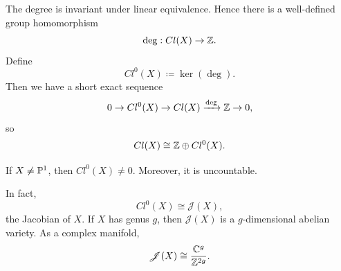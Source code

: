 The degree is invariant under linear equivalence.
Hence there is a well-defined group homomorphism
\[
    \deg : Cl(X) \to \mathbb{Z}.
\]
Define
\[
    Cl^0(X) \coloneqq \ker(\deg).
\]
Then we have a short exact sequence
\[
    0 \to Cl^0(X) \to Cl(X) \xrightarrow{\deg} \mathbb{Z} \to 0,
\]
so
\[
    Cl(X) \cong \mathbb{Z} \oplus Cl^0(X).
\]

\begin{theorem*}{
    If $X \neq \mathbb{P}^1$, then $Cl^0(X) \neq 0$.
    Moreover, it is uncountable.
}
\end{theorem*}

In fact,
\[
    Cl^0(X) \cong \mathscr{J}(X),
\]
the Jacobian of $X$.
If $X$ has genus $g$, then $\mathscr{J}(X)$ is a $g$-dimensional abelian variety.
As a complex manifold,
\[
    \mathscr{J}(X) \cong \dfrac{\mathbb{C}^g}{\mathbb{Z}^{2g}}.
\]